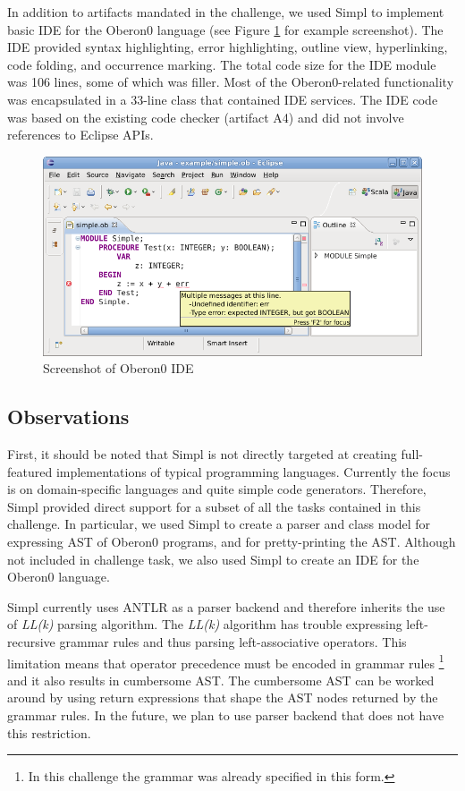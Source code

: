 In addition to artifacts mandated in the challenge, we used Simpl
to implement basic IDE for the Oberon0 language (see Figure \ref{fig:Screenshot-of-Oberon0}
for example screenshot). The IDE provided syntax highlighting, error
highlighting, outline view, hyperlinking, code folding, and occurrence
marking. The total code size for the IDE module was 106 lines, some
of which was filler. Most of the Oberon0-related functionality was
encapsulated in a 33-line class that contained IDE services. The IDE
code was based on the existing code checker (artifact A4) and did
not involve references to Eclipse APIs. 

%
\begin{figure}[!h]
\includegraphics[width=12cm]{simpl/ide-screenshot.png}

\caption{\label{fig:Screenshot-of-Oberon0}Screenshot of Oberon0 IDE}

\end{figure}





\subsection{Observations}

First, it should be noted that Simpl is not directly targeted at creating
full-featured implementations of typical programming languages. Currently
the focus is on domain-specific languages and quite simple code generators.
Therefore, Simpl provided direct support for a subset of all the tasks
contained in this challenge. In particular, we used Simpl to create
a parser and class model for expressing AST of Oberon0 programs, and
for pretty-printing the AST. Although not included in challenge task,
we also used Simpl to create an IDE for the Oberon0 language.

Simpl currently uses ANTLR as a parser backend and therefore inherits
the use of \emph{LL(k)} parsing algorithm. The \emph{LL(k)} algorithm
has trouble expressing left-recursive grammar rules and thus parsing
left-associative operators. This limitation means that operator precedence
must be encoded in grammar rules%
\footnote{In this challenge the grammar was already specified in this form.%
} and it also results in cumbersome AST. The cumbersome AST can be
worked around by using return expressions that shape the AST nodes
returned by the grammar rules. In the future, we plan to use parser
backend that does not have this restriction.

